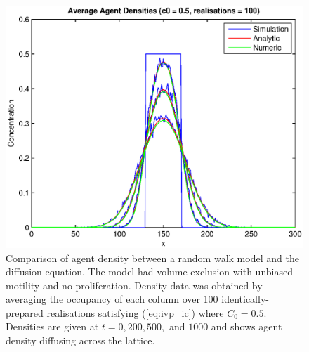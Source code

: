 \documentclass[11pt,titlepage,a4paper]{article}
\begin{document}
		\begin{figure}[tbh]
			\centering
				\includegraphics[width=\textwidth]{./Figures/cell_concentration_5_100.eps}
			\caption{Comparison of agent density between a random walk model and the diffusion equation. The model had volume exclusion with unbiased motility and no proliferation. Density data was obtained by averaging the occupancy of each column over 100 identically-prepared realisations satisfying (\ref{eq:ivp_ic}) where $C_0 = 0.5$. Densities are given at $t = 0, 200, 500,$ and $1000$ and shows agent density diffusing across the lattice.}
			\label{fig:cell_concentration_5_100}
		\end{figure}
\end{document}
